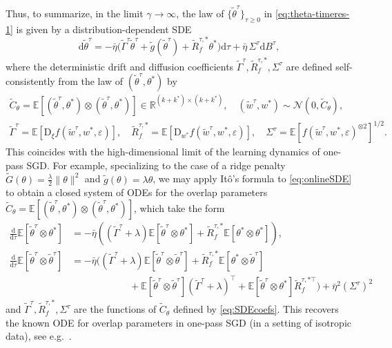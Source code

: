 \documentclass[11pt,letterpaper,reqno]{amsart}
\theoremstyle{definition}
\def\eps{\varepsilon}
\def\d{\mathrm{d}}
\def\D{\mathrm{D}}
\def\E{\mathbb{E}}
\def\R{\mathbb{R}}
\def\cN{\mathcal{N}}
\begin{document}
Thus, to summarize, in the limit $\gamma \to \infty$,
the law of $\{\tilde \theta^\tau\}_{\tau \geq 0}$ in \eqref{eq:theta-timeres-1}
is given by a distribution-dependent SDE
\begin{equation}\label{eq:onlineSDE}
\d \tilde\theta^\tau={-}\bar\eta \Big(\tilde \Gamma^\tau
\tilde\theta^\tau+\tilde g(\tilde \theta^\tau)+\tilde R_f^{\tau,*}
\theta^*\Big)\d \tau+\bar \eta\,\Sigma^\tau \d B^\tau,
\end{equation}
where the deterministic drift and diffusion
coefficients $\tilde \Gamma^\tau,\tilde R_f^{\tau,*},\Sigma^\tau$ are
defined self-consistently from the law of $(\tilde\theta^\tau,\theta^*)$ by
\begin{equation}\label{eq:SDEcoefs}
\begin{gathered}
\tilde C_\theta=\E[(\tilde \theta^\tau,\theta^*) \otimes (\tilde
\theta^\tau,\theta^*)] \in \R^{(k+k^*) \times (k+k^*)},
\quad (\tilde w^\tau,w^*) \sim \cN(0,\tilde C_\theta),\\
\tilde \Gamma^\tau=\E[\D_\xi f(\tilde w^\tau,w^*,\eps)],
\quad \tilde R_f^{\tau,*}=\E[\D_{w^*} f(\tilde w^\tau,w^*,\eps)],
\quad \Sigma^\tau=\E[f(\tilde w^\tau,w^*,\eps)^{\otimes 2}]^{1/2}.
\end{gathered}
\end{equation}
This coincides with the high-dimensional limit of the
learning dynamics of one-pass SGD. For example, specializing to the case of a
ridge penalty $\tilde G(\theta)=\frac{\lambda}{2}\|\theta\|^2$ and
$\tilde g(\theta)=\lambda \theta$, we may apply It\^o's formula to
\eqref{eq:onlineSDE} to obtain a closed system of ODEs for the overlap
parameters $\tilde C_\theta=\E[(\tilde \theta^\tau,\theta^*) \otimes (\tilde
\theta^\tau,\theta^*)]$, which take the form
\begin{align*}
\frac{\d}{\d \tau} \E [\tilde\theta^\tau \otimes \theta^*] &= -\bar\eta
\left((\tilde \Gamma^\tau+\lambda)\E[\tilde\theta^\tau \otimes \theta^*] +
\tilde R_f^{\tau,*}\E[\theta^* \otimes \theta^*] \right),\\
\frac{\d}{\d \tau} \mathbb{E} [\tilde\theta^\tau \otimes \tilde\theta^\tau] &= -\bar\eta \bigg((\tilde \Gamma^\tau+\lambda)
\E[\tilde\theta^\tau \otimes \tilde\theta^\tau]  + 
\tilde R_f^{\tau,*}\E[\theta^* \otimes \tilde\theta^\tau]\\
&\hspace{1in}+\E[\tilde\theta^\tau \otimes \tilde\theta^\tau]
(\tilde \Gamma^\tau+\lambda)^\top + \E[\tilde\theta^\tau \otimes \theta^*]
\tilde R_f^{\tau,*\top} \bigg) + \bar\eta^2(\Sigma^\tau)^2
\end{align*}
and $\tilde \Gamma^\tau,\tilde R_f^{\tau,*},\Sigma^\tau$ are the functions of
$\tilde C_\theta$ defined by \eqref{eq:SDEcoefs}. This recovers the known ODE
for overlap parameters in one-pass SGD (in a setting of isotropic data), see
e.g.\ \cite[Corollary 1.1]{collins2024hitting}.
\end{document}
